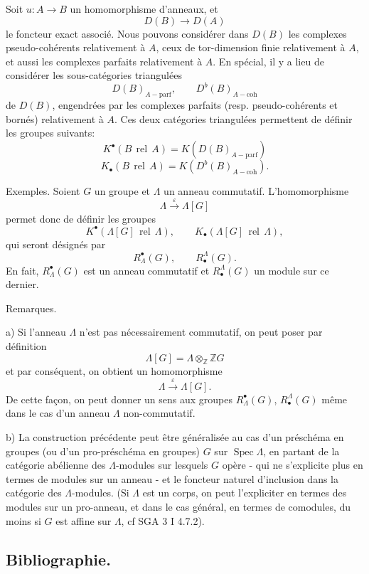 \documentclass[11pt]{article}
\DeclareMathOperator{\Spec}{Spec}
\providecommand{\parf}{\mathrm{parf}}
\providecommand{\coh}{\mathrm{coh}}
\providecommand{\Spec}{\operatorname{Spec}}
\providecommand{\Spec}{\operatorname{Spec}}
\providecommand{\parf}{\mathrm{parf}}
\providecommand{\coh}{\mathrm{coh}}
\providecommand{\Spec}{\operatorname{Spec}}
\providecommand{\Spec}{\operatorname{Spec}}
\begin{document}
Soit $u:A\to B$ un homomorphisme d'anneaux, et
\[
D(B)\longrightarrow D(A)
\]
le foncteur exact associé. Nous pouvons considérer dans $D(B)$ les complexes pseudo-cohérents relativement à $A$, ceux de tor-dimension finie relativement à $A$, et aussi les complexes parfaits relativement à $A$. En spécial, il y a lieu de considérer les sous-catégories triangulées
\[
D(B)_{A-\parf},\qquad D^b(B)_{A-\coh}
\]
de $D(B)$, engendrées par les complexes parfaits (resp. pseudo-cohérents et bornés) relativement à $A$. Ces deux catégories triangulées permettent de définir les groupes suivants:
\[
K^{\bullet}(B\operatorname{\,rel\,}A)=K(D(B)_{A-\parf})
\]
\[
K_\bullet(B\operatorname{\,rel\,}A)=K(D^b(B)_{A-\coh}).
\]

Exemples. Soient $G$ un groupe et $\Lambda$ un anneau commutatif. L'homomorphisme
\[
\Lambda\xrightarrow{\varepsilon}\Lambda[G]
\]
permet donc de définir les groupes
\[
K^{\bullet}(\Lambda[G]\operatorname{\,rel\,}\Lambda),\qquad
K_\bullet(\Lambda[G]\operatorname{\,rel\,}\Lambda),
\]
qui seront désignés par
\[
R^{\bullet}_\Lambda(G),\qquad R^\Lambda_\bullet(G).
\]
En fait, $R^{\bullet}_\Lambda(G)$ est un anneau commutatif et $R^\Lambda_\bullet(G)$ un module sur ce dernier.

Remarques.

a) Si l'anneau $\Lambda$ n'est pas nécessairement commutatif, on peut poser par définition
\[
\Lambda[G]=\Lambda\otimes_{\mathbb Z}\mathbb ZG
\]
et par conséquent, on obtient un homomorphisme
\[
\Lambda\xrightarrow{\varepsilon}\Lambda[G].
\]
De cette façon, on peut donner un sens aux groupes $R^{\bullet}_\Lambda(G)$, $R^\Lambda_\bullet(G)$ même dans le cas d'un anneau $\Lambda$ non-commutatif.

b) La construction précédente peut être généralisée au cas d'un préschéma en groupes (ou d'un pro-préschéma en groupes) $G$ sur $\Spec\Lambda$, en partant de la catégorie abélienne des $\Lambda$-modules sur lesquels $G$ opère - qui ne s'explicite plus en termes de modules sur un anneau - et le foncteur naturel d'inclusion dans la catégorie des $\Lambda$-modules. (Si $\Lambda$ est un corps, on peut l'expliciter en termes des modules sur un pro-anneau, et dans le cas général, en termes de comodules, du moins si $G$ est affine sur $\Lambda$, cf SGA 3 I 4.7.2).

\subsection*{Bibliographie.}
\end{document}
